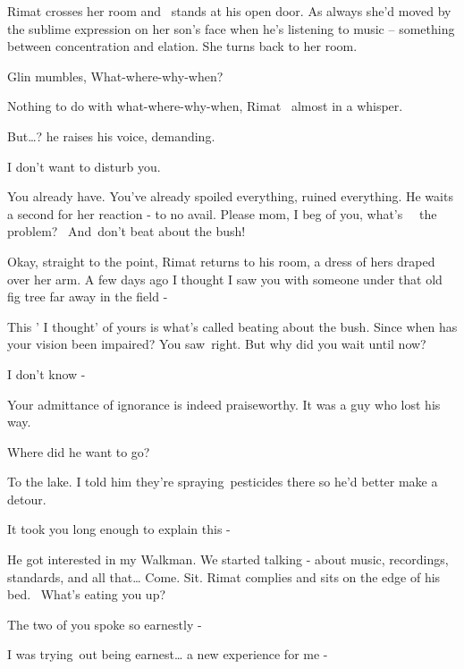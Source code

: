 \documentclass[letterpaper]{article}
\begin{document}
Rimat crosses her room and \ stands at his open door. As always she'd moved by the sublime expression on her son's face
when he's listening to music -- something between concentration and elation. She turns back to her room.

Glin mumbles, {\textquotedbl}What-where-why-when?{\textquotedbl} 

{\textquotedbl}Nothing to do with what-where-why-when,{\textquotedbl} Rimat \ almost in a whisper. 

{\textquotedbl}But{\dots}?{\textquotedbl} he raises his voice, demanding. 

{\textquotedbl}I don't want to disturb you.{\textquotedbl} 

{\textquotedbl}You already have. You've already spoiled everything, ruined everything.{\textquotedbl} He waits a second
for her reaction - to no avail. {\textquotedbl}Please mom, I beg of you, what's \ \ the problem? \ And~don't beat about
the bush!{\textquotedbl} 

{\textquotedbl}Okay, straight to the point,{\textquotedbl} Rimat returns to his room, a dress of hers draped over her
arm. {\textquotedbl}A few days ago I thought I saw you with someone under that old fig tree far away in the field
-{\textquotedbl} 

{\textquotedbl}This ' I thought' of yours is what's called beating about the bush. Since when has your vision been
impaired? You saw~right. But why did you wait until now?{\textquotedbl} 

{\textquotedbl}I don't know -{\textquotedbl} 

{\textquotedbl}Your admittance of ignorance is indeed praiseworthy. It was a guy who lost his way.{\textquotedbl} 

{\textquotedbl}Where did he want to go?{\textquotedbl} 

{\textquotedbl}To the lake. I told him they're spraying~pesticides there so he'd better make a detour.{\textquotedbl} 

{\textquotedbl}It took you long enough to explain this -{\textquotedbl} 

{\textquotedbl}He got interested in my Walkman. We started talking - about music, recordings, standards, and all
that{\dots} Come. Sit.{\textquotedbl} Rimat complies and sits on the edge of his bed.~ {\textquotedbl}What's eating you
up?{\textquotedbl} 

{\textquotedbl}The two of you spoke so earnestly -{\textquotedbl} 

{\textquotedbl}I was trying~out being earnest{\dots} a new experience for me -{\textquotedbl}
\end{document}
